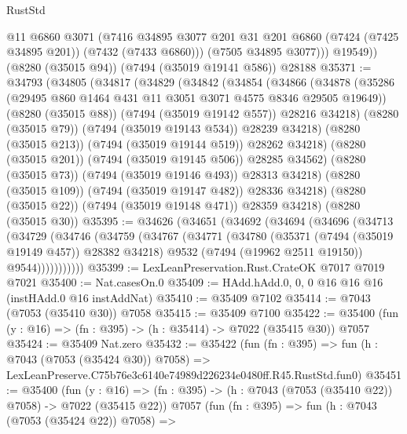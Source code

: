 \begin{lexlean}{RustStd}
\begin{coremodule}
            @11
            @6860
            @3071
            (@7416
              @34895
              @3077
              @201
              @31
              @201
              @6860
              (@7424 (@7425 @34895 @201))
              (@7432 (@7433 @6860)))
            (@7505 @34895 @3077)))
        @19549))
    (@8280 (@35015 @94))
    (@7494 (@35019 @19141 @586))
    @28188
@35371 := @34793
    (@34805
      (@34817
        (@34829
          (@34842
            (@34854
              (@34866
                (@34878
                  (@35286 (@29495 @860 @1464 @431 @11 @3051 @3071 @4575 @8346 @29505 @19649))
                  (@8280 (@35015 @88))
                  (@7494 (@35019 @19142 @557))
                  @28216
                  @34218)
                (@8280 (@35015 @79))
                (@7494 (@35019 @19143 @534))
                @28239
                @34218)
              (@8280 (@35015 @213))
              (@7494 (@35019 @19144 @519))
              @28262
              @34218)
            (@8280 (@35015 @201))
            (@7494 (@35019 @19145 @506))
            @28285
            @34562)
          (@8280 (@35015 @73))
          (@7494 (@35019 @19146 @493))
          @28313
          @34218)
        (@8280 (@35015 @109))
        (@7494 (@35019 @19147 @482))
        @28336
        @34218)
      (@8280 (@35015 @22))
      (@7494 (@35019 @19148 @471))
      @28359
      @34218)
    (@8280 (@35015 @30))
@35395 := @34626
    (@34651
      (@34692
        (@34694
          (@34696
            (@34713
              (@34729
                (@34746
                  (@34759
                    (@34767
                      (@34771
                        (@34780
                          (@35371 (@7494 (@35019 @19149 @457)) @28382 @34218)
                          @9532
                          (@7494 (@19962 @2511 @19150))
                          @9544)))))))))))
@35399 := LexLeanPreservation.Rust.CrateOK @7017 @7019 @7021
@35400 := Nat.casesOn.{0}
@35409 := HAdd.hAdd.{0, 0, 0} @16 @16 @16 (instHAdd.{0} @16 instAddNat)
@35410 := @35409 @7102
@35414 := @7043 (@7053 (@35410 @30)) @7058
@35415 := @35409 @7100
@35422 := @35400 (fun (y : @16) => (fn : @395) -> (h : @35414) -> @7022 (@35415 @30)) @7057
@35424 := @35409 Nat.zero
@35432 := @35422
    (fun (fn : @395) =>
    fun (h : @7043 (@7053 (@35424 @30)) @7058) =>
    LexLeanPreserve.C75b76e3c6140e74989d226234e0480ff.R45.RustStd.fun0)
@35451 := @35400
    (fun (y : @16) => (fn : @395) -> (h : @7043 (@7053 (@35410 @22)) @7058) -> @7022 (@35415 @22))
    @7057
    (fun (fn : @395) =>
    fun (h : @7043 (@7053 (@35424 @22)) @7058) =>

\end{coremodule}
\end{lexlean}

